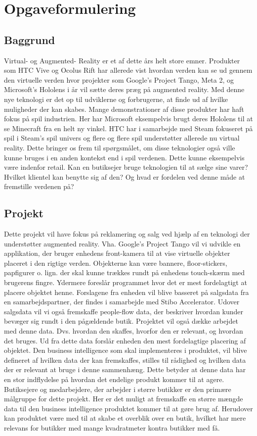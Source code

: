 \chapter{Opgaveformulering}
\section{Baggrund}

Virtual- og Augmented- Reality er et af dette års helt store emner. Produkter som HTC Vive og Ocolus Rift har allerede vist hvordan verden kan se ud gennem den virtuelle verden hvor projekter som Google’s Project Tango, Meta 2, og Microsoft’s Hololens i år vil sætte deres præg på augmented reality. Med denne nye teknologi er det op til udviklerne og forbrugerne, at finde ud af hvilke muligheder der kan skabes.
Mange demonstrationer af disse produkter har haft fokus på spil industrien. Her har Microsoft eksempelvis brugt deres Hololens til at se Minecraft fra en helt ny vinkel. HTC har i samarbejde med Steam fokuseret på spil i Steam’s spil univers og flere og flere spil understøtter allerede nu virtual reality. Dette bringer os frem til spørgsmålet, om disse teknologier også ville kunne bruges i en anden kontekst end i spil verdenen. Dette kunne eksempelvis være indenfor retail. Kan en butiksejer bruge teknologien til at sælge sine varer? Hvilket klientel kan benytte sig af den? Og hvad er fordelen ved denne måde at fremstille verdenen på? 

\section{Projekt}
Dette projekt vil have fokus på reklamering og salg ved hjælp af en teknologi der understøtter augmented reality. Vha. Google’s Project Tango vil vi udvikle en applikation, der bruger enhedens front-kamera til at vise virtuelle objekter placeret i den rigtige verden. Objekterne kan være bannere, floor-stickers, papfigurer o. lign. der skal kunne trækkes rundt på enhedens touch-skærm med brugerens fingre. Ydermere foreslår programmet hvor det er mest fordelagtigt at placere objektet henne.
Forslagene fra enheden vil blive basseret på salgsdata fra en samarbejdspartner, der findes i samarbejde med Stibo Accelerator. Udover salgsdata vil vi også fremskaffe people-flow data, der beskriver hvordan kunder bevæger sig rundt i den pågældende butik. Projektet vil også dække arbejdet med denne data. Dvs. hvordan den skaffes, hvorfor den er relevant, og hvordan det bruges. Ud fra dette data forslår enheden den mest fordelagtige placering af objektet. 
Den business intelligence som skal implementeres i produktet, vil blive defineret af hvilken data der kan fremskaffes, stilles til rådighed og hvilken data der er relevant at bruge i denne sammenhæng. Dette betyder at denne data har en stor indflydelse på hvordan det endelige produkt kommer til at agere.
Butiksejere og medarbejdere, der arbejder i større butikker er den primære målgruppe for dette projekt. Her er det muligt at fremskaffe en større mængde data til den business intelligence produktet kommer til at gøre brug af. Herudover kan produktet være med til at skabe et overblik over en butik, hvilket har mere relevans for butikker med mange kvadratmeter kontra butikker med få.

